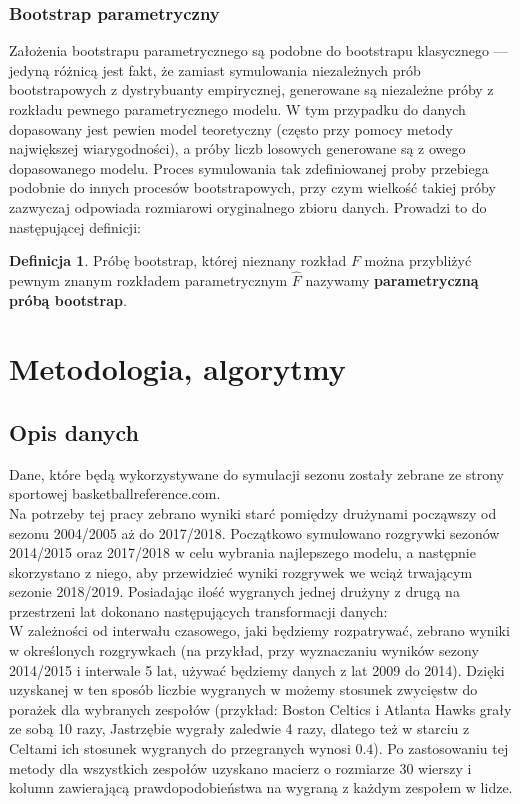 \documentclass[inzynierska]{pwr_wmat_praca_dyplomowa}
\theoremstyle{plain}
\numberwithin{theorem}{chapter}
\theoremstyle{definition}
\numberwithin{theorem}{chapter}
\newtheorem{definition}[theorem]{Definicja}
\begin{document}
\subsection{Bootstrap parametryczny}
Założenia bootstrapu parametrycznego są podobne do bootstrapu klasycznego --- jedyną różnicą jest fakt, że zamiast symulowania niezależnych prób bootstrapowych z dystrybuanty empirycznej, generowane są niezależne próby z rozkładu pewnego parametrycznego modelu. 
W tym przypadku do danych dopasowany jest pewien model teoretyczny (często przy pomocy metody największej wiarygodności), a próby liczb losowych generowane są z owego dopasowanego modelu. Proces symulowania tak zdefiniowanej proby przebiega podobnie do innych procesów bootstrapowych, przy czym wielkość takiej próby zazwyczaj odpowiada rozmiarowi oryginalnego zbioru danych. Prowadzi to do następującej definicji:
\begin{definition}
	Próbę bootstrap, której nieznany rozkład $F$ można przybliżyć pewnym znanym rozkładem parametrycznym $\hat{F}$ nazywamy \textbf{parametryczną próbą bootstrap}. 
\end{definition}
 
\chapter{Metodologia, algorytmy}\label{rodzial_algorytmy}
\section{Opis danych}
Dane, które będą wykorzystywane do symulacji sezonu zostały zebrane ze strony sportowej basketballreference.com.
\\
Na potrzeby tej pracy zebrano wyniki starć pomiędzy drużynami począwszy od sezonu 2004/2005 aż do 2017/2018. Początkowo symulowano rozgrywki sezonów 2014/2015 oraz 2017/2018 w celu wybrania najlepszego modelu, a następnie skorzystano z niego, aby przewidzieć wyniki rozgrywek we wciąż trwającym sezonie 2018/2019.
Posiadając ilość wygranych jednej drużyny z drugą na przestrzeni lat dokonano następujących transformacji danych:
\\
W zależności od interwału czasowego, jaki będziemy rozpatrywać, zebrano wyniki w określonych rozgrywkach (na przykład, przy wyznaczaniu wyników sezony 2014/2015 i interwale 5 lat, używać będziemy danych z lat 2009 do 2014). Dzięki uzyskanej w ten sposób liczbie wygranych w możemy stosunek zwycięstw do porażek dla wybranych zespołów (przykład: Boston Celtics i Atlanta Hawks grały ze sobą 10 razy, Jastrzębie wygrały zaledwie 4 razy, dlatego też w starciu z Celtami ich stosunek wygranych do przegranych wynosi $0.4$). Po zastosowaniu tej metody dla wszystkich zespołów uzyskano macierz o rozmiarze 30 wierszy i kolumn zawierającą prawdopodobieństwa na wygraną z każdym zespołem w lidze.
\end{document}
